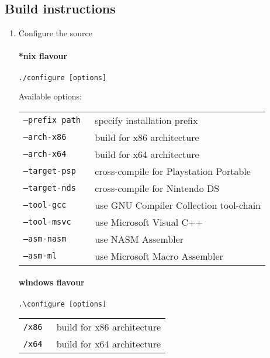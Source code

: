 \pagebreak

\subsection{Build instructions}


\begin{enumerate}
\item Configure the source

\paragraph{*nix flavour}
\begin{lstlisting}
./configure [options]
\end{lstlisting}

Available options:

\begin{tabular}{ll}
{\tt --prefix path } & specify installation prefix \\
{\tt --arch-x86 } & build for x86 architecture \\
{\tt --arch-x64 } & build for x64 architecture \\
{\tt --target-psp } & cross-compile for Playstation Portable \\
{\tt --target-nds } & cross-compile for Nintendo DS \\
{\tt --tool-gcc } & use GNU Compiler Collection tool-chain \\
{\tt --tool-msvc } & use Microsoft Visual C++ \\
{\tt --asm-nasm } & use NASM Assembler \\
{\tt --asm-ml } & use Microsoft Macro Assembler \\
\end{tabular}


\paragraph{windows flavour}

\begin{lstlisting}
.\configure [options]
\end{lstlisting}

\begin{tabular}{ll}
{\tt /x86 } & build for x86 architecture \\
{\tt /x64 } & build for x64 architecture \\
\end{tabular}


\end{enumerate}
